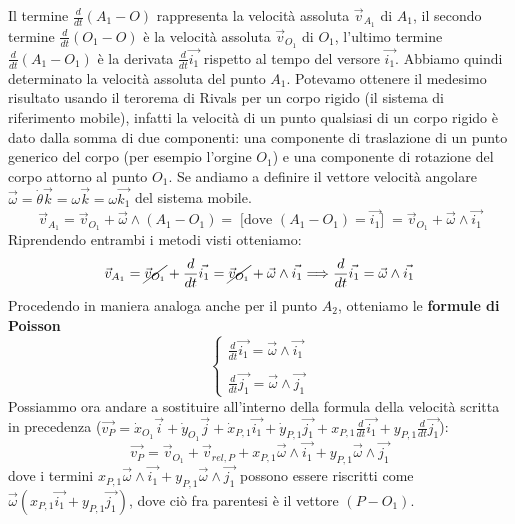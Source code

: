 Il termine $\frac{d}{dt}(A_1-O)$ rappresenta la velocità assoluta $\vec{v}_{A_1}$ di $A_1$, il secondo termine $\frac{d}{dt}(O_1 - O)$ è la velocità assoluta $\vec{v}_{O_1}$ di $O_1$, l'ultimo termine $\frac{d}{dt}(A_1 -O_1)$ è la derivata $\frac{d}{dt}\vec{i_1}$ rispetto al tempo del versore $\vec{i_1}$. Abbiamo quindi determinato la velocità assoluta del punto $A_1$.\newline
Potevamo ottenere il medesimo risultato usando il terorema di Rivals per un corpo rigido (il sistema di riferimento mobile), infatti la velocità di un punto qualsiasi di un corpo rigido è dato dalla somma di due componenti: una componente di traslazione di un punto generico del corpo (per esempio l'orgine $O_1$) e una componente di rotazione del corpo attorno al punto $O_1$. Se andiamo a definire il vettore velocità angolare $\vec{\omega} = \dot{\theta} \vec{k} = \omega \vec{k} = \omega \vec{k_1}$ del sistema mobile.
\[
    \vec{v}_{A_1} = \vec{v}_{O_1} + \vec{\omega} \land (A_1 - O_1) =\;\text{[dove $(A_1 - O_1) = \vec{i_1}$]}\; = \vec{v}_{O_1} + \vec{\omega}\land \vec{i_1}
\]
\newline
Riprendendo entrambi i metodi visti otteniamo:
\[
    \vec{v}_{A_1} = \cancel{\vec{v}_{O_1}} + \frac{d}{dt}\vec{i_1} = \cancel{\vec{v}_{O_1}} + \vec{\omega} \land \vec{i_1} \Longrightarrow \frac{d}{dt}\vec{i_1} = \vec{\omega}\land \vec{i_1}
\]
Procedendo in maniera analoga anche per il punto $A_2$, otteniamo le \textbf{formule di Poisson}
\[
    \begin{cases}
        \frac{d}{dt}\vec{i_1} = \vec{\omega}\land \vec{i_1}\\
        \\
        \frac{d}{dt}\vec{j_1} = \vec{\omega}\land \vec{j_1}
    \end{cases}
\]
Possiammo ora andare a sostituire all'interno della formula della velocità scritta in precedenza ($
    \vec{v_P} = 
        \dot{x}_{O_1}\vec{i} + 
        \dot{y}_{O_1} \vec{j} + 
        \dot{x}_{P,1} \vec{i_1} + 
        \dot{y}_{P,1} \vec{j_1} + 
        x_{P,1} \frac{d}{dt}\vec{i_1} + 
        y_{P,1} \frac{d}{dt} \vec{j_1}
$):
\[
    \vec{v_P} = 
        \vec{v}_{O_1} + \vec{v}_{rel, P} +
        x_{P,1} \vec{\omega}\land \vec{i_1} + 
        y_{P,1} \vec{\omega}\land \vec{j_1}
\]
dove i termini $x_{P,1} \vec{\omega}\land \vec{i_1} + y_{P,1} \vec{\omega}\land \vec{j_1}$ possono essere riscritti come $\vec{\omega}(x_{P,1} \vec{i_1} + y_{P,1} \vec{j_1})$, dove ciò fra parentesi è il vettore $(P-O_1)$.\newline
\newline
